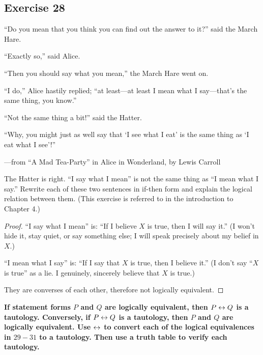 \documentclass[14pt]{extarticle}
\begin{document}
\subsection{Exercise 28} “Do you mean that you think you can find out the answer
to it?” said the March Hare.

“Exactly so,” said Alice.

“Then you should say what you mean,” the March Hare went on.

“I do,” Alice hastily replied; “at least—at least I mean what I say—that’s the
same thing, you know.”

“Not the same thing a bit!” said the Hatter.

“Why, you might just as well say that ‘I see what I eat’ is the same thing as ‘I
eat what I see’!”

—from “A Mad Tea-Party” in Alice in Wonderland, by Lewis Carroll

The Hatter is right. “I say what I mean” is not the same thing as “I mean what I
say.” Rewrite each of these two sentences in if-then form and explain the
logical relation between them. (This exercise is referred to in the introduction
to Chapter 4.)

\begin{proof} “I say what I mean” is: ``If I believe $X$ is true, then I will
say it.'' (I won't hide it, stay quiet, or say something else; I will speak
precisely about my belief in $X$.)

“I mean what I say” is: ``If I say that $X$ is true, then I believe it.'' (I
don't say ``$X$ is true'' as a lie. I genuinely, sincerely believe that $X$ is
true.)

They are converses of each other, therefore not logically equivalent.
\end{proof}

{\bf If statement forms $P$ and $Q$ are logically equivalent, then $P \leftrightarrow Q$ is
a tautology. Conversely, if $P \leftrightarrow Q$ is a tautology, then $P$ and $Q$ are
logically equivalent. Use $\leftrightarrow$ to convert each of the logical equivalences in
$29-31$ to a tautology. Then use a truth table to verify each tautology.}
\end{document}
